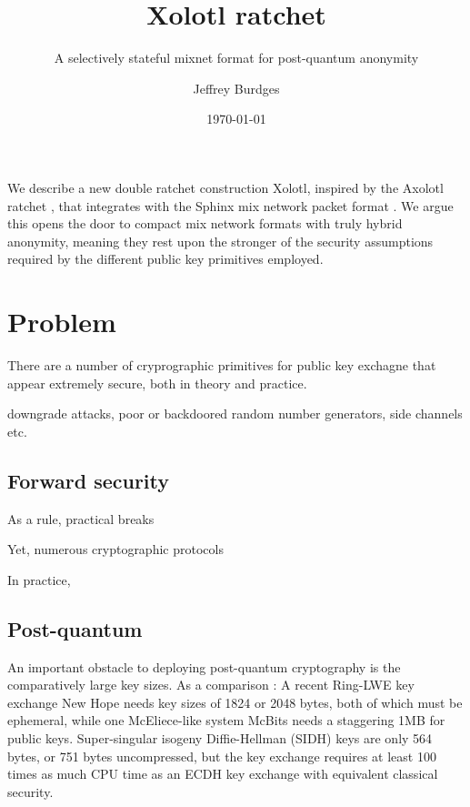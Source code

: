 \documentclass[twoside,letterpaper]{sig-alternate}
\title{Xolotl ratchet}
\subtitle{A selectively stateful mixnet format for post-quantum anonymity}
\author{Jeffrey Burdges}
\date{\today}
\begin{document}
\maketitle



We describe a new double ratchet construction Xolotl,
 inspired by the Axolotl ratchet \cite{Axolotl},
that integrates with the Sphinx mix network packet format \cite{Sphinx}.
We argue this opens the door to compact mix network formats with
truly hybrid anonymity, meaning they rest upon the stronger of
 the security assumptions required by
 the different public key primitives employed.


\section{Problem}

There are a number of cryprographic primitives for public key
exchagne that appear extremely secure, both in theory and practice.

\cite{}

downgrade attacks, poor or backdoored random number generators,
side channels 
etc.


\subsection{Forward security}


As a rule, practical breaks 

Yet, numerous cryptographic protocols 





In practice, 


\subsection{Post-quantum}

An important obstacle to deploying post-quantum cryptography is
the comparatively large key sizes.  As a comparison : 
%
A recent Ring-LWE key exchange New Hope \cite[\S7, p.10]{NewHope} needs
 key sizes of 1824 or 2048 bytes, both of which must be ephemeral,
while one McEliece-like system McBits %
 needs a staggering 1MB for public keys.
%
Super-singular isogeny Diffie-Hellman (SIDH) \cite[p. 21]{SIDH-2016} keys
are only 564 bytes, or 751 bytes uncompressed, but
 the key exchange requires at least 100 times as much CPU time as
 an ECDH key exchange with equivalent classical security.
\end{document}
